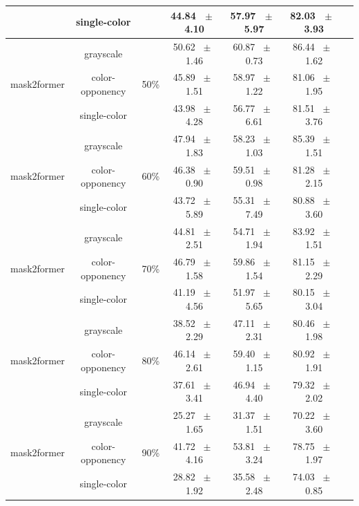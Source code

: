 \begin{table}[h]
\begin{tabular}{@{}lccc ccc@{}}
    & single-color &  & 44.84 ~$\pm$~ 4.10 & 57.97 ~$\pm$~ 5.97 & 82.03 ~$\pm$~ 3.93 \\
    \midrule
    \multirow{3}{*}{mask2former} & grayscale & \multirow{3}{*}{50\%} & 50.62 ~$\pm$~ 1.46 & 60.87 ~$\pm$~ 0.73 & 86.44 ~$\pm$~ 1.62 \\
    & color-opponency &  & 45.89 ~$\pm$~ 1.51 & 58.97 ~$\pm$~ 1.22 & 81.06 ~$\pm$~ 1.95 \\
    & single-color &  & 43.98 ~$\pm$~ 4.28 & 56.77 ~$\pm$~ 6.61 & 81.51 ~$\pm$~ 3.76 \\
    \midrule
    \multirow{3}{*}{mask2former} & grayscale & \multirow{3}{*}{60\%} & 47.94 ~$\pm$~ 1.83 & 58.23 ~$\pm$~ 1.03 & 85.39 ~$\pm$~ 1.51 \\
    & color-opponency &  & 46.38 ~$\pm$~ 0.90 & 59.51 ~$\pm$~ 0.98 & 81.28 ~$\pm$~ 2.15 \\
    & single-color &  & 43.72 ~$\pm$~ 5.89 & 55.31 ~$\pm$~ 7.49 & 80.88 ~$\pm$~ 3.60 \\
    \midrule
    \multirow{3}{*}{mask2former} & grayscale & \multirow{3}{*}{70\%} & 44.81 ~$\pm$~ 2.51 & 54.71 ~$\pm$~ 1.94 & 83.92 ~$\pm$~ 1.51 \\
    & color-opponency &  & 46.79 ~$\pm$~ 1.58 & 59.86 ~$\pm$~ 1.54 & 81.15 ~$\pm$~ 2.29 \\
    & single-color &  & 41.19 ~$\pm$~ 4.56 & 51.97 ~$\pm$~ 5.65 & 80.15 ~$\pm$~ 3.04 \\
    \midrule
    \multirow{3}{*}{mask2former} & grayscale & \multirow{3}{*}{80\%} & 38.52 ~$\pm$~ 2.29 & 47.11 ~$\pm$~ 2.31 & 80.46 ~$\pm$~ 1.98 \\
    & color-opponency &  & 46.14 ~$\pm$~ 2.61 & 59.40 ~$\pm$~ 1.15 & 80.92 ~$\pm$~ 1.91 \\
    & single-color &  & 37.61 ~$\pm$~ 3.41 & 46.94 ~$\pm$~ 4.40 & 79.32 ~$\pm$~ 2.02 \\
    \midrule
    \multirow{3}{*}{mask2former} & grayscale & \multirow{3}{*}{90\%} & 25.27 ~$\pm$~ 1.65 & 31.37 ~$\pm$~ 1.51 & 70.22 ~$\pm$~ 3.60 \\
    & color-opponency &  & 41.72 ~$\pm$~ 4.16 & 53.81 ~$\pm$~ 3.24 & 78.75 ~$\pm$~ 1.97 \\
    & single-color &  & 28.82 ~$\pm$~ 1.92 & 35.58 ~$\pm$~ 2.48 & 74.03 ~$\pm$~ 0.85 \\
    \midrule
    \bottomrule
  \end{tabular}
  \label{tab:sparse_results_mask2former_acdc_snow}
\end{table}